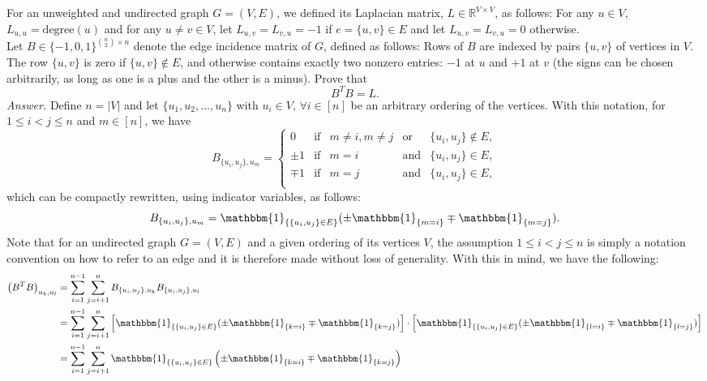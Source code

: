 \documentclass[10pt,usenames,dvipsnames]{article}
\newcommand{\R}{\mathbb{R}}
\newcommand{\ind}{\mathbbm{1}} %
\newenvironment{exercise}[2][Exercise]{\begin{trivlist}
  \item[\hskip \labelsep {\bfseries #1}\hskip \labelsep {\bfseries #2.}]}{\end{trivlist}}
\begin{document}
  
  \newpage
  \begin{exercise}{3a} 
For an unweighted and undirected graph $G=(V,E)$, we defined its Laplacian matrix, $L \in \R^{V\times V}$, as follows: For any $u \in V$, $L_{u,u} = \mbox{degree}(u)$ and for any $u \neq v \in V$, let $L_{u,v} = L_{v,u} = -1$ if $e=\{u,v\} \in E$ and let $L_{u,v} = L_{v,u} = 0$ otherwise. \\
Let $B \in \{-1,0,1\}^{\binom{n}{2} \times n}$ denote the edge incidence matrix of $G$, defined as follows: Rows of $B$ are indexed by pairs $\{u,v\}$ of vertices in $V$. The row $\{u,v\}$ is zero if $\{u,v\}\not\in E$, and otherwise contains exactly two nonzero entries: $-1$ at $u$ and $+1$ at $v$ (the signs can be chosen arbitrarily, as long as one is a plus and the other is a minus). Prove that
$$
B^T B = L.
$$
\textit{Answer.} Define $n=|V|$ and let $\{u_1,u_2,...,u_n\}$ with  $u_i \in V, \,\forall i \in [n]$ be an arbitrary ordering of the vertices.
 With this notation, for $1\leq i <  j \leq n$ and $m \in [n]$, we have  
 $$ 
 B_{\{u_i,u_j\}, u_m} = \left\{ 
 	\begin{array}{rclcl} 
		0  & \mbox{if} & m \neq i, m \neq j & \mbox{or} & \{u_i,u_j\} \not\in E, \\
		\pm 1 & \mbox{if} & m = i & \mbox{and} &  \{u_i,u_j\} \in E, \\
		\mp 1 & \mbox{if} & m = j & \mbox{and} &  \{u_i,u_j\} \in E,\\
 	\end{array} \right.
$$
which can be compactly rewritten, using indicator variables, as follows:
$$
B_{\{u_i,u_j\}, u_m} = \ind_{\left\{\{u_i,u_j\} \in E\right\}}(\pm \ind_{\left\{m=i\right\}} \mp  \ind_{\left\{m=j\right\}}).
$$
Note that for an undirected graph $G=(V,E)$ and a given ordering of its vertices $V$, the assumption $1\leq i <  j \leq n$ is simply a notation convention on how to refer to an edge and it is therefore made without loss of generality. With this in mind, we have the following:
\begin{align*}
\left( B^TB\right)_{u_k, u_l} 
	& =  \sum_{i=1}^{n-1} \sum_{j=i+1}^n B_{\{u_i,u_j\}, u_k} B_{\{u_i,u_j\}, u_l} \\
	& = \sum_{i=1}^{n-1} \sum_{j=i+1}^n 
	\left[ \ind_{\left\{\{u_i,u_j\} \in E\right\}}(\pm \ind_{\left\{k=i\right\}} \mp  \ind_{\left\{k=j\right\}})   \right]
	\cdot 
	\left[ \ind_{\left\{\{u_i,u_j\} \in E\right\}}(\pm \ind_{\left\{l=i\right\}} \mp  \ind_{\left\{l=j\right\}}) \right] \\ 
	& = \sum_{i=1}^{n-1} \sum_{j=i+1}^n 
	\ind_{\left\{\{u_i,u_j\} \in E\right\}} \left(\pm \ind_{\left\{k=i\right\}} \mp  \ind_{\left\{k=j\right\}}  \right) 

\end{align*}
\end{exercise}
\end{document}
